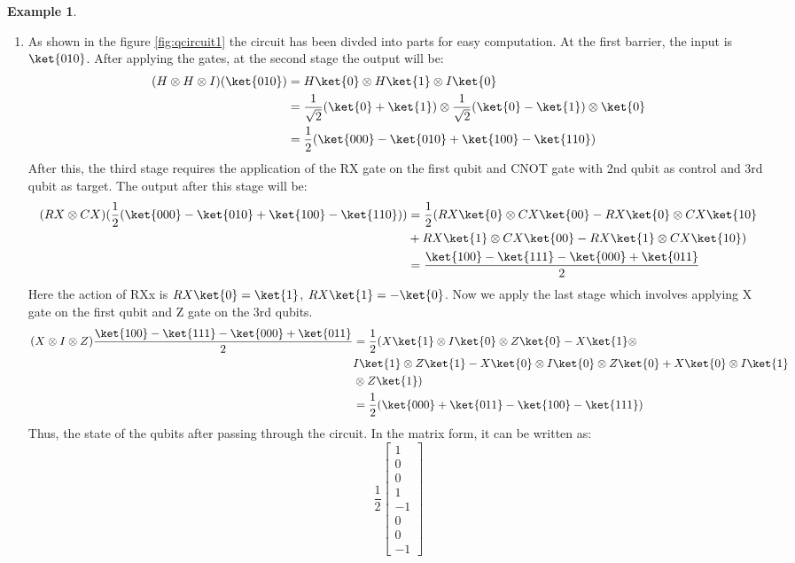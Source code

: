\documentclass[12pt, oneside]{book}
\theoremstyle{definition}
\theoremstyle{definition}
\newtheorem{example}{Example}[section]
\theoremstyle{remark}
\begin{document}
\begin{example}
\begin{enumerate}
        \item As shown in the figure \ref{fig:qcircuit1} the circuit has been divded into parts for easy computation. At the first barrier, the input is $\ket{010}$.
        After applying the gates, at the second stage the output will be:
        \begin{align*}
            (H \otimes H \otimes I)(\ket{010})&=H\ket{0} \otimes H\ket{1}\otimes I\ket{0}\\
            &=\frac{1}{\sqrt{2}}(\ket{0}+\ket{1})\otimes\frac{1}{\sqrt{2}}(\ket{0}-\ket{1})\otimes\ket{0}\\
            &=\frac{1}{2}(\ket{000}-\ket{010}+\ket{100}-\ket{110})
        \end{align*}
        After this, the third stage requires the application of the RX gate on the first qubit and CNOT gate with 2nd qubit as control and 3rd qubit as target.
        The output after this stage will be:
        \begin{align*}
            (RX \otimes CX)(\frac{1}{2}(\ket{000}-\ket{010}+\ket{100}-\ket{110}))&=\frac{1}{2}(RX\ket{0} \otimes CX\ket{00}-RX\ket{0} \otimes CX\ket{10}\\
            &+RX\ket{1}\otimes CX\ket{00}-RX\ket{1}\otimes CX\ket{10})\\
            &=\frac{\ket{100}-\ket{111}-\ket{000}+\ket{011}}{2}
        \end{align*}
        Here the action of RXx is $RX\ket{0}=\ket{1}$, $RX\ket{1}=-\ket{0}$.
        Now we apply the last stage which involves applying X gate on the first qubit and Z gate on the 3rd qubits.
        \begin{align*} 
            (X \otimes I \otimes Z)\frac{\ket{100}-\ket{111}-\ket{000}+\ket{011}}{2}&=\frac{1}{2}(X\ket{1} \otimes I\ket{0} \otimes Z\ket{0}-X\ket{1}\otimes \\
            & I\ket{1}\otimes Z\ket{1}-X\ket{0}\otimes I\ket{0}\otimes Z\ket{0}+X\ket{0}\otimes I\ket{1}\\
            &\otimes Z\ket{1})\\
            &=\frac{1}{2}(\ket{000}+\ket{011}-\ket{100}-\ket{111})
        \end{align*}
        Thus, the state of the qubits after passing through the circuit.
        In the matrix form, it can be written as:
        \[
            \frac{1}{2}\begin{bmatrix} 1 \\ 0 \\ 0 \\ 1 \\ -1 \\ 0 \\ 0 \\-1 \end{bmatrix}
\]
\end{enumerate}
\end{example}
\end{document}
